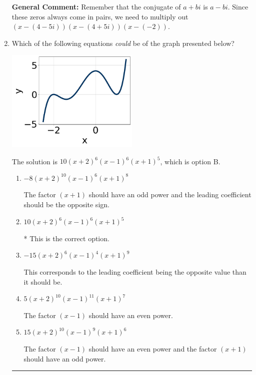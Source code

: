 \documentclass{extbook}[14pt]
\newcommand{\litem}[1]{\item #1

\rule{\textwidth}{0.4pt}}
\begin{document}
\begin{enumerate}
{\textbf{General Comment:} Remember that the conjugate of $a+bi$ is $a-bi$. Since these zeros always come in pairs, we need to multiply out $(x-(4 - 5 i))(x-(4 + 5 i))(x-(-2))$.
}
\litem{
Which of the following equations \textit{could} be of the graph presented below?

\begin{center}
    \includegraphics[width=0.5\textwidth]{../Figures/polyGraphToFunctionCopyB.png}
\end{center}


The solution is \( 10(x + 2)^{6} (x - 1)^{6} (x + 1)^{5} \), which is option B.\begin{enumerate}[label=\Alph*.]
\item \( -8(x + 2)^{10} (x - 1)^{6} (x + 1)^{8} \)

The factor $(x + 1)$ should have an odd power and the leading coefficient should be the opposite sign.
\item \( 10(x + 2)^{6} (x - 1)^{6} (x + 1)^{5} \)

* This is the correct option.
\item \( -15(x + 2)^{6} (x - 1)^{4} (x + 1)^{9} \)

This corresponds to the leading coefficient being the opposite value than it should be.
\item \( 5(x + 2)^{10} (x - 1)^{11} (x + 1)^{7} \)

The factor $(x - 1)$ should have an even power.
\item \( 15(x + 2)^{10} (x - 1)^{9} (x + 1)^{6} \)

The factor $(x - 1)$ should have an even power and the factor $(x + 1)$ should have an odd power.
\end{enumerate}

}
\end{enumerate}
\end{document}
